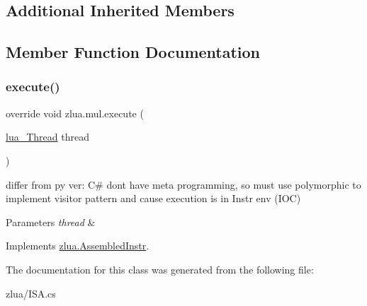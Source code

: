 \subsection*{Additional Inherited Members}


\subsection{Member Function Documentation}
\mbox{\label{classzlua_1_1mul_a22002ab020aaabcf37eddae16b6ba10a}} 
\subsubsection{\texorpdfstring{execute()}{execute()}}
{\footnotesize\ttfamily override void zlua.\+mul.\+execute (\begin{DoxyParamCaption}\item[{\mbox{\hyperlink{classzlua_1_1lua___thread}{lua\+\_\+\+Thread}}}]{thread }\end{DoxyParamCaption})\hspace{0.3cm}{\ttfamily [virtual]}}



differ from py ver\+: C\# dont have meta programming, so must use polymorphic to implement visitor pattern and cause execution is in Instr env (I\+OC) 


\begin{DoxyParams}{Parameters}
{\em thread} & \\
\hline
\end{DoxyParams}


Implements \mbox{\hyperlink{classzlua_1_1_assembled_instr_a44e081c4565b90b75e4a67b8dd418feb}{zlua.\+Assembled\+Instr}}.



The documentation for this class was generated from the following file\+:\begin{DoxyCompactItemize}
\item 
zlua/I\+S\+A.\+cs\end{DoxyCompactItemize}

